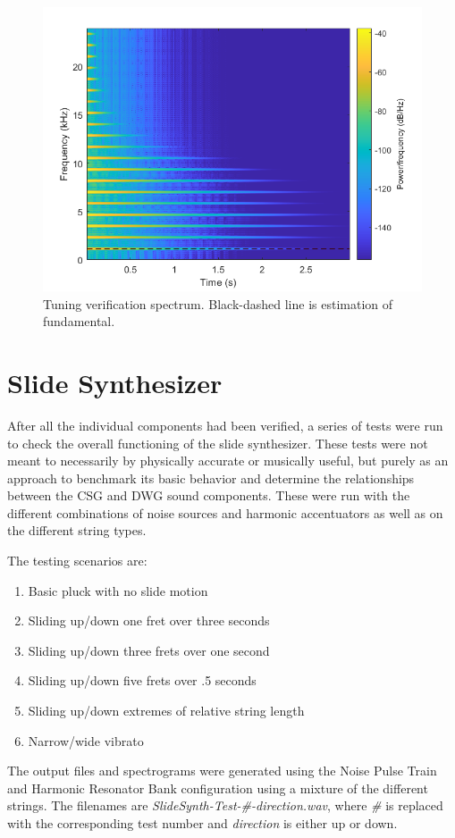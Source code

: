 \documentclass[../main.tex]{subfiles}
\begin{document}
\begin{figure}[h!]
    \centering
    \includegraphics[scale=.58]{./images/plots/StringDWGInterpSpec.png}
    \caption{Tuning verification spectrum. Black-dashed line is estimation of fundamental.}
    \label{fig:DWGInterpSpec}
\end{figure}


\section{Slide Synthesizer}
After all the individual components had been verified, a series of tests were run to check the overall functioning of the slide synthesizer. These tests were not meant to necessarily by physically accurate or musically useful, but purely as an approach to benchmark its basic behavior and determine the relationships between the CSG and DWG sound components. These were run with the different combinations of noise sources and harmonic accentuators as well as on the different string types. 

The testing scenarios are:
\begin{enumerate}
    \item Basic pluck with no slide motion
    \item Sliding up/down one fret over three seconds
    \item Sliding up/down three frets over one second
    \item Sliding up/down five frets over .5 seconds
    \item Sliding up/down extremes of relative string length
    \item Narrow/wide vibrato
\end{enumerate}
The output files and spectrograms were generated using the Noise Pulse Train and Harmonic Resonator Bank configuration using a mixture of the different strings. The filenames are \emph{SlideSynth-Test-\#-direction.wav}, where \emph{\#} is replaced with the corresponding test number and \emph{direction} is either up or down.
\end{document}
